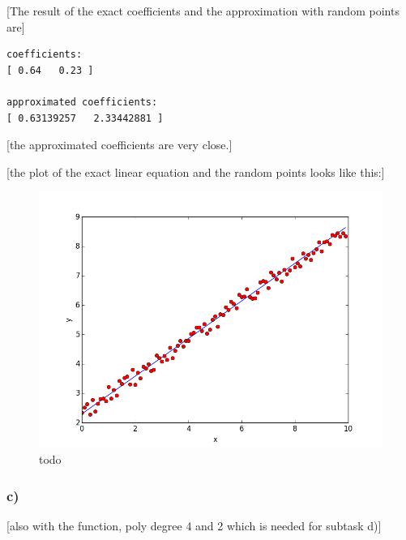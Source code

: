 [The result of the exact coefficients and the approximation with random points are]

\begin{lstlisting}[caption=Result of 1.1 a), keywordstyle=\color{black}]
coefficients:
[ 0.64   0.23 ]

approximated coefficients:
[ 0.63139257   2.33442881 ]
\end{lstlisting}

[the approximated coefficients are very close.]

[the plot of the exact linear equation and the random points looks like this:]

\begin{figure}[!ht]
\includegraphics[width=1\textwidth]{chapters/images/figure-5-10-b}
\caption{todo}
\end{figure}


\subsubsection{c)}

[also with the function, poly degree 4 and 2 which is needed for subtask d)]

